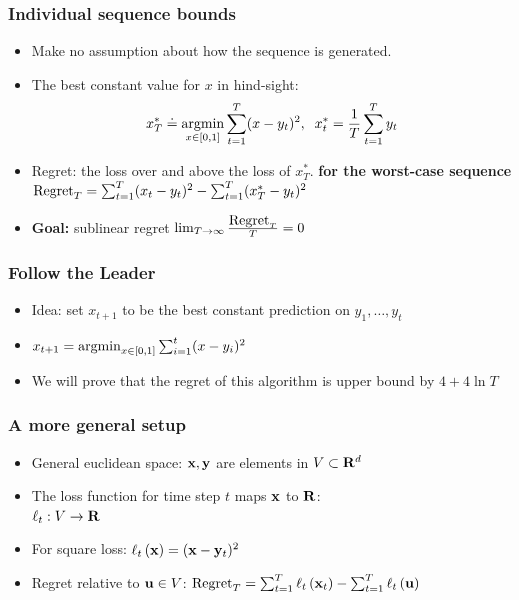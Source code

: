 \documentclass{beamer}
\begin{document}
\begin{frame}
\frametitle{Individual sequence bounds}
\begin{itemize}
\item Make no assumption about how the sequence is generated.
\item The best constant value for $x$ in hind-sight:\\
  $$x^*_T \doteq \operatorname*{argmin}_{x \in [0,1]} \sum_{t=1}^T (x-y_t)^2,\;\; x^*_t=\frac{1}{T}
  \sum_{t=1}^T y_t$$ 
\item Regret: the loss over and above the loss of $x^*_T$. {\bf for the
    worst-case sequence}
  $ \mbox{Regret}_T = \sum_{t=1}^T (x_t-y_t)^2 - \sum_{t=1}^T (x^*_T-y_t)^2
  $
\item {\bf Goal:} sublinear regret $\lim_{T \to \infty} \frac{\mbox{Regret}_T}{T} = 0$
\end{itemize}
\end{frame}

\begin{frame}
\frametitle{Follow the Leader}
\begin{itemize}
\item Idea: set $x_{t+1}$ to be the best constant prediction on $y_1,\ldots,y_t$
\item 
  $x_{t+1} = \operatorname*{argmin}_{x \in [0,1]} \sum_{i=1}^t (x-y_i)^2$ 
\item We will prove that the regret of this algorithm is upper bound
  by $4+4 \ln T$
\end{itemize}
\end{frame}
\iffalse
\begin{frame}
\frametitle{A more general setup}
\begin{itemize}
\item General euclidean space: ${\mathbf x},{\mathbf y}$ are elements in $V \subset {\mathbf R}^d$
\item The loss function for time step $t$ maps ${\mathbf x}$ to ${\mathbf R}$:\\
  $\ell_t: V \to {\mathbf R}$
\item For square loss: $\ell_{t}\left( {\mathbf x} \right) = ({\mathbf x} -{\mathbf y}_t)^2$
\item Regret relative to ${\mathbf u} \in V$:
$\mbox{Regret}_T = \sum_{t=1}^T \ell_{t}\left( {\mathbf x}_t \right) - \sum_{t=1}^T
  \ell_{t}\left( {\mathbf u} \right) $
\end{itemize}
\end{frame}
\end{document}
